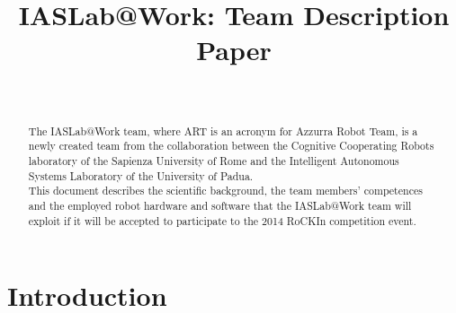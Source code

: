 \documentclass[conference]{IEEEtran}
\begin{document}
%
\title{IASLab@Work: Team Description Paper}

\author{\\
}

\maketitle


\begin{abstract}
The IASLab@Work team, where ART is an acronym for Azzurra Robot Team, is a newly created team from the collaboration between the Cognitive Cooperating Robots laboratory of the Sapienza University of Rome and the Intelligent Autonomous Systems Laboratory of the University of Padua. \\
This document describes the scientific background, the team members' competences and the employed robot hardware and software that the IASLab@Work team will exploit if it will be accepted to participate to the 2014 RoCKIn competition event.
\end{abstract}


\section{Introduction}
\end{document}
